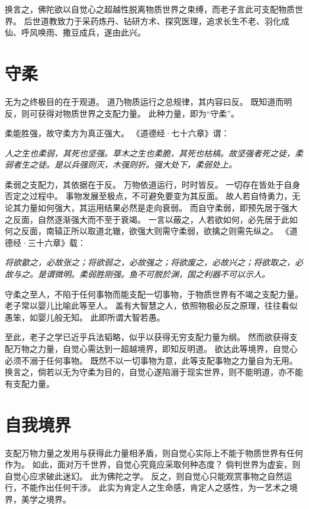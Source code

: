 \documentclass[11pt]{article}
\begin{document}
换言之，佛陀欲以自觉心之超越性脱离物质世界之束缚，而老子言此可支配物质世界。
后世道教致力于采药炼丹、钻研方术、探究医理，追求长生不老、羽化成仙、呼风唤雨、撒豆成兵，遂由此兴。
  
\section{守柔}
无为之终极目的在于观道。
道乃物质运行之总规律，其内容曰反。
既知道而明反，则可获得对物质世界之支配力量。
此种力量，即为“守柔”。

\par

柔能胜强，故守柔方为真正强大。
《道德经·七十六章》谓：

\textit{人之生也柔弱，其死也坚强。草木之生也柔脆，其死也枯槁。故坚强者死之徒，柔弱者生之徒。是以兵强则灭，木强则折。强大处下，柔弱处上。}

\par

柔弱之支配力，其依据在于反。
万物依道运行，时时皆反。
一切存在皆处于自身否定之过程中。
事物发展至极点，不可避免要变为其反面。
故人若自恃勇力，无论其力量如何强大，其运用结果必然是走向衰弱。
而自守柔弱，即预先居于强大之反面，自然逐渐强大而不至于衰竭。
一言以蔽之，人若欲如何，必先居于此如何之反面，南辕正所以取道北辙，欲强大则需守柔弱，欲擒之则需先纵之。
《道德经·三十六章》载：

\textit{将欲歙之，必故张之；将欲弱之，必故强之；将欲废之，必故兴之；将欲取之，必故与之。是谓微明。柔弱胜刚强。鱼不可脱於渊，国之利器不可以示人。}
  
\par

守柔之至人，不陷于任何事物而能支配一切事物，于物质世界有不竭之支配力量。
老子常以婴儿比喻此等至人。
盖有大智慧之人，依照物极必反之原理，往往看似愚笨，如婴儿般无知。
此即所谓大智若愚。

\par

至此，老子之学已近乎兵法韬略，似乎以获得无穷支配力量为纲。
然而欲获得支配万物之力量，自觉心需达到一超越境界，即知反明道。
欲达此等境界，自觉心必须不溺于任何事物。
既然不以一切事物为意，此等支配事物之力量自为无用。
换言之，倘若以无为守柔为目的，自觉心遂陷溺于现实世界，则不能明道，亦不能有支配力量。

\section{自我境界}
支配万物力量之发用与获得此力量相矛盾，则自觉心实际上不能于物质世界有任何作为。
如此，面对万千世界，自觉心究竟应采取何种态度？
倘判世界为虚妄，则自觉心应求破此迷幻。
此为佛陀之学。
反之，则自觉心只能观赏事物之自然运行，不能作出任何干涉。
此实为肯定人之生命感，肯定人之感性，为一艺术之境界，美学之境界。
\end{document}
